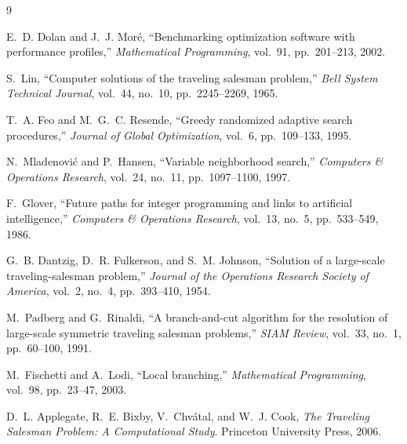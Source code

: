 \documentclass{article}
\begin{document}
\begin{thebibliography}{9}

E.~D. Dolan and J.~J. Moré,
``Benchmarking optimization software with performance profiles,''
\textit{Mathematical Programming}, vol.~91, pp.~201--213, 2002.

S.~Lin,
``Computer solutions of the traveling salesman problem,''
\textit{Bell System Technical Journal}, vol.~44, no.~10, pp.~2245--2269, 1965.

T.~A. Feo and M.~G.~C. Resende,
``Greedy randomized adaptive search procedures,''
\textit{Journal of Global Optimization}, vol.~6, pp.~109--133, 1995.

N.~Mladenović and P.~Hansen,
``Variable neighborhood search,''
\textit{Computers \& Operations Research}, vol.~24, no.~11, pp.~1097--1100, 1997.

F.~Glover,
``Future paths for integer programming and links to artificial intelligence,''
\textit{Computers \& Operations Research}, vol.~13, no.~5, pp.~533--549, 1986.

G.~B. Dantzig, D.~R. Fulkerson, and S.~M. Johnson,
``Solution of a large-scale traveling-salesman problem,''
\textit{Journal of the Operations Research Society of America}, vol.~2, no.~4, pp.~393--410, 1954.

M.~Padberg and G.~Rinaldi,
``A branch-and-cut algorithm for the resolution of large-scale symmetric traveling salesman problems,''
\textit{SIAM Review}, vol.~33, no.~1, pp.~60--100, 1991.

M.~Fischetti and A.~Lodi,
``Local branching,''
\textit{Mathematical Programming}, vol.~98, pp.~23--47, 2003.

D.~L. Applegate, R.~E. Bixby, V.~Chv\'atal, and W.~J. Cook,
\textit{The Traveling Salesman Problem: A Computational Study}.
Princeton University Press, 2006.

\end{thebibliography}
\end{document}
